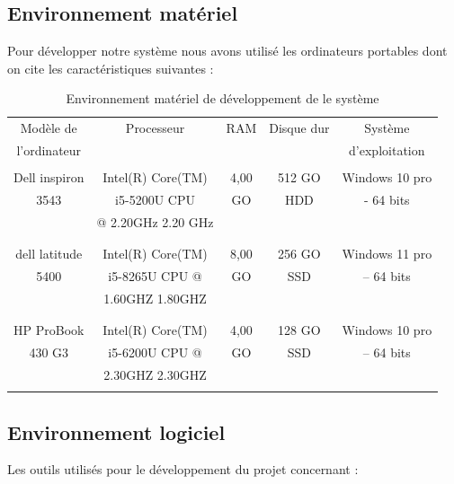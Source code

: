 \documentclass[edit,12pt,a4paper,ChapStyle,oneside,doubleinterligne]{report}
\begin{document}
\subsection{Environnement matériel }
Pour développer notre système nous avons utilisé les ordinateurs portables dont on cite les caractéristiques suivantes :  
\begin{table}[h!]
    \centering
    \begin{tabular}{|c|c|c|c|c|}
    \hline
        Modèle de & Processeur & RAM & Disque dur & Système  \\
        l’ordinateur & & & & d’exploitation \\
        \hline
        &&&&\\
         Dell inspiron & Intel(R) Core(TM)   & 4,00  & 512 GO & Windows 10 pro  \\
         3543 & i5-5200U CPU & GO  & HDD & - 64 bits \\
         & @ 2.20GHz   2.20 GHz & & &\\
         &&&&\\
         \hline
        &&&&\\
         dell latitude  & Intel(R) Core(TM)  & 8,00 & 256 GO & Windows 11 pro  \\
         5400 & i5-8265U CPU @ & GO & SSD & – 64 bits \\
         & 1.60GHZ 1.80GHZ & & &\\
         &&&&\\
         \hline
         &&&&\\
         HP ProBook  & Intel(R) Core(TM)   & 4,00& 128 GO  & Windows 10 pro  \\
         430 G3 & i5-6200U CPU @ & GO & SSD & – 64 bits\\
         & 2.30GHZ 2.30GHZ & & &\\
         &&&&\\
         \hline
    \end{tabular}
    \caption{Environnement matériel de développement de le système}
    \label{tab:materiel}
\end{table}
\subsection{Environnement logiciel }
Les outils utilisés pour le développement du projet concernant :
\end{document}
